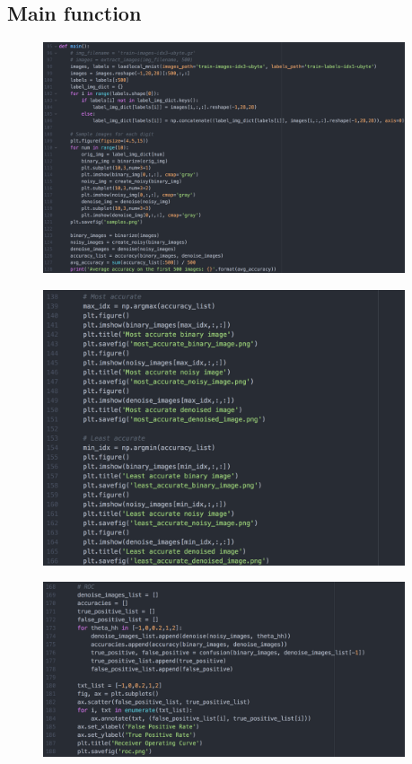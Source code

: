 \documentclass[a4paper]{article}
\begin{document}
\subsection{Main function}
\begin{figure}[H]
\centering
\includegraphics[width=0.95\textwidth]{4.png}
\end{figure}
\begin{figure}[H]
\centering
\includegraphics[width=0.95\textwidth]{5.png}
\end{figure}
\begin{figure}[H]
\centering
\includegraphics[width=0.95\textwidth]{6.png}
\end{figure}
\end{document}
